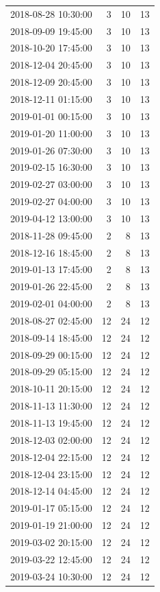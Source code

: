 \begin{tabular}{lrrr}
2018-08-28 10:30:00 & 3 & 10 & 13 \\
2018-09-09 19:45:00 & 3 & 10 & 13 \\
2018-10-20 17:45:00 & 3 & 10 & 13 \\
2018-12-04 20:45:00 & 3 & 10 & 13 \\
2018-12-09 20:45:00 & 3 & 10 & 13 \\
2018-12-11 01:15:00 & 3 & 10 & 13 \\
2019-01-01 00:15:00 & 3 & 10 & 13 \\
2019-01-20 11:00:00 & 3 & 10 & 13 \\
2019-01-26 07:30:00 & 3 & 10 & 13 \\
2019-02-15 16:30:00 & 3 & 10 & 13 \\
2019-02-27 03:00:00 & 3 & 10 & 13 \\
2019-02-27 04:00:00 & 3 & 10 & 13 \\
2019-04-12 13:00:00 & 3 & 10 & 13 \\
2018-11-28 09:45:00 & 2 & 8 & 13 \\
2018-12-16 18:45:00 & 2 & 8 & 13 \\
2019-01-13 17:45:00 & 2 & 8 & 13 \\
2019-01-26 22:45:00 & 2 & 8 & 13 \\
2019-02-01 04:00:00 & 2 & 8 & 13 \\
2018-08-27 02:45:00 & 12 & 24 & 12 \\
2018-09-14 18:45:00 & 12 & 24 & 12 \\
2018-09-29 00:15:00 & 12 & 24 & 12 \\
2018-09-29 05:15:00 & 12 & 24 & 12 \\
2018-10-11 20:15:00 & 12 & 24 & 12 \\
2018-11-13 11:30:00 & 12 & 24 & 12 \\
2018-11-13 19:45:00 & 12 & 24 & 12 \\
2018-12-03 02:00:00 & 12 & 24 & 12 \\
2018-12-04 22:15:00 & 12 & 24 & 12 \\
2018-12-04 23:15:00 & 12 & 24 & 12 \\
2018-12-14 04:45:00 & 12 & 24 & 12 \\
2019-01-17 05:15:00 & 12 & 24 & 12 \\
2019-01-19 21:00:00 & 12 & 24 & 12 \\
2019-03-02 20:15:00 & 12 & 24 & 12 \\
2019-03-22 12:45:00 & 12 & 24 & 12 \\
2019-03-24 10:30:00 & 12 & 24 & 12 \\

\end{tabular}
